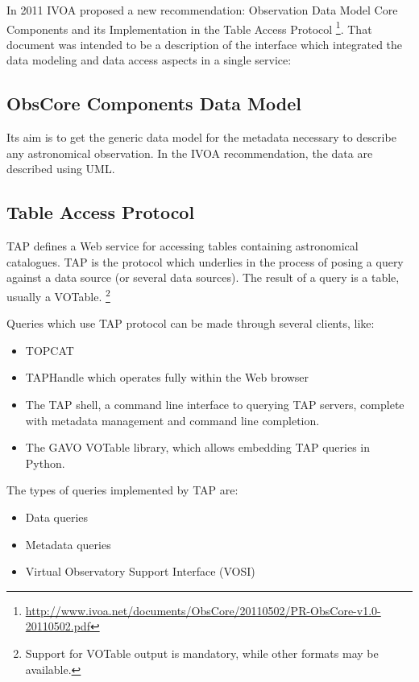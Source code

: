 In 2011 IVOA proposed a new recommendation: Observation Data Model Core Components and its Implementation in the Table Access Protocol \footnote{\url{http://www.ivoa.net/documents/ObsCore/20110502/PR-ObsCore-v1.0-20110502.pdf}}. That document was intended to be a description of the interface which integrated the data modeling and data access aspects in a single service: \newline 


\subsection{ObsCore Components Data Model}

Its aim is to get the generic data model for the metadata necessary to describe any astronomical observation. In the IVOA recommendation, the data are described using UML.

\subsection{Table Access Protocol}

TAP defines a Web service for accessing tables containing astronomical catalogues. TAP is the protocol which underlies in the process of posing a query against a data source (or several data sources). The result of a query is a table, usually a VOTable. \footnote{Support for VOTable output is mandatory, while other formats may be available.}  \newline

Queries which use TAP protocol can be made through several clients, like:
\begin{itemize}
\item TOPCAT
\item TAPHandle which operates fully within the Web browser
\item The TAP shell, a command line interface to querying TAP servers, complete with metadata management and command line completion.
\item The GAVO VOTable library, which allows embedding TAP queries in Python.
\end{itemize}

The types of queries implemented by TAP are:

\begin{itemize}
\item Data queries
\item Metadata queries
\item Virtual Observatory Support Interface (VOSI)
\end{itemize}


